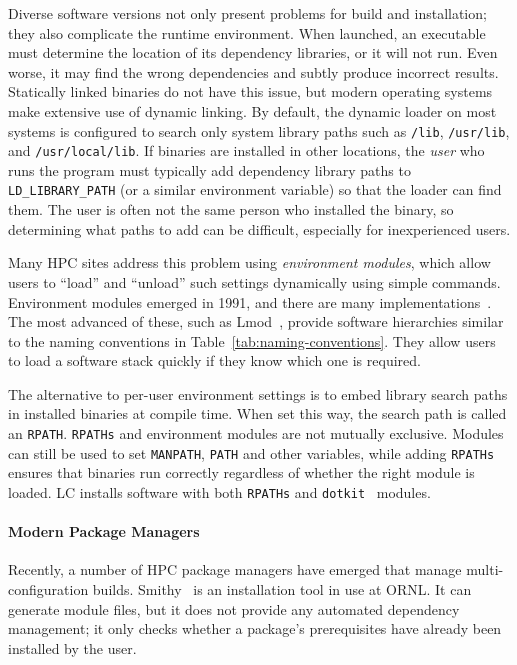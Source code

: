 Diverse software versions not only present problems for build and installation;
they also complicate the runtime environment. When launched, an executable
must determine the location of its dependency libraries, or it will not run.
Even worse, it may find the wrong dependencies and subtly produce incorrect results.
Statically linked binaries do not have this issue, but modern
operating systems make extensive use of dynamic linking.
By default, the dynamic loader on most systems is configured to search only
system library paths such as {\tt /lib}, {\tt /usr/lib}, and
{\tt /usr/local/lib}.  If binaries are installed in other locations, the
{\it user} who runs the program must typically add dependency library paths to
{\tt LD\_LIBRARY\_PATH} (or a similar environment variable) so that the loader
can find them.  The user is often not the same person who installed the binary,
so determining what paths to add can be difficult, especially for inexperienced users.

Many HPC sites address this problem using {\it environment modules}, which
allow users to ``load'' and ``unload'' such settings dynamically using simple
commands. Environment modules emerged in 1991, and there are many implementations~\cite{dotkit,furlani+:lisa91,furlani+:lisa96,mclay:lmod,mclay:lmod-tutorial}.
The most advanced of these, such as Lmod~\cite{mclay:lmod,mclay:lmod-tutorial},
provide software hierarchies similar to the naming conventions in
Table~\ref{tab:naming-conventions}. They allow users to load a software stack
quickly if they know which one is required.

The alternative to per-user environment settings is to embed library search
paths in installed binaries at compile time. When set this way, the search
path is called an {\tt RPATH}. {\tt RPATHs} and environment modules are not
mutually exclusive. Modules can still be used to set {\tt MANPATH}, {\tt PATH}
and other variables, while adding {\tt RPATHs} ensures that binaries run correctly
regardless of whether the right module is loaded. LC installs software with
both {\tt RPATHs} and {\tt dotkit}~\cite{dotkit} modules.

\paragraph{Modern Package Managers}

Recently, a number of HPC package managers have emerged that manage
multi-configuration builds.
%
Smithy~\cite{digirolamo:smithy} is an installation tool in use at ORNL. It
can generate module files, but it does not provide any
automated dependency management; it only checks whether a package's
prerequisites have already been installed by the user. 


